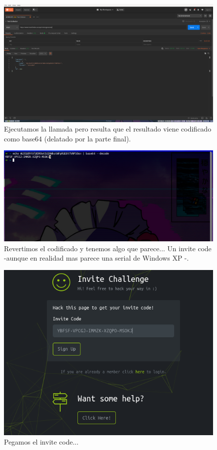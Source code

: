 \documentclass[11pt]{utalcaDoc}
\begin{document}
\begin{figure}[H]
	\centering
	\includegraphics[width=.9\textwidth]{images/06.png}
	\caption{ Ejecutamos la llamada pero resulta que el resultado viene codificado como base64 (delatado por la parte final).}
\end{figure}

\begin{figure}[H]
	\centering
	\includegraphics[width=.9\textwidth]{images/07.png}
	\caption{ Revertimos el codificado y tenemos algo que parece... Un invite code -aunque en realidad mas parece una serial de Windows XP -. }
\end{figure}

\begin{figure}[H]
	\centering
	\includegraphics[width=.9\textwidth]{images/08.png}
	\caption{ Pegamos el invite code... }
\end{figure}
\end{document}
